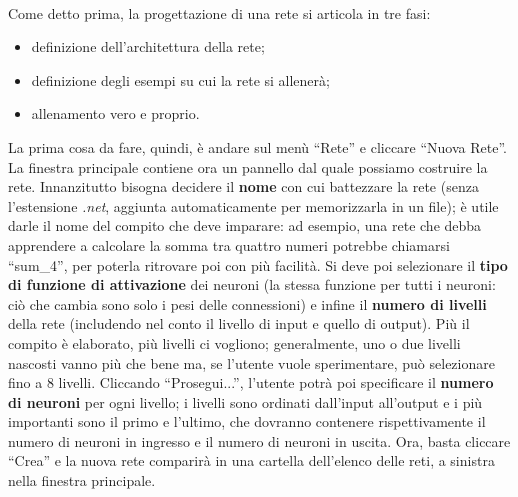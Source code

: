 \documentclass{article}
\begin{document}
\paragraph{} Come detto prima, la progettazione di una rete si articola in tre fasi:
\begin{itemize}
	\item definizione dell'architettura della rete;
	\item definizione degli esempi su cui la rete si allenerà;
	\item allenamento vero e proprio.
\end{itemize}
La prima cosa da fare, quindi, è andare sul menù “Rete” e cliccare “Nuova Rete”. La finestra principale contiene ora un pannello dal quale possiamo costruire la rete. Innanzitutto bisogna decidere il \textbf{nome} con cui battezzare la rete (senza l'estensione \textit{.net}, aggiunta automaticamente per memorizzarla in un file); è utile darle il nome del compito che deve imparare: ad esempio, una rete che debba apprendere a calcolare la somma tra quattro numeri potrebbe chiamarsi “sum\_4”, per poterla ritrovare poi con più facilità. Si deve poi selezionare il \textbf{tipo di funzione di attivazione} dei neuroni (la stessa funzione per tutti i neuroni: ciò che cambia sono solo i pesi delle connessioni) e infine il \textbf{numero di livelli} della rete (includendo nel conto il livello di input e quello di output). Più il compito è elaborato, più livelli ci vogliono; generalmente, uno o due livelli nascosti vanno più che bene ma, se l'utente vuole sperimentare, può selezionare fino a 8 livelli. Cliccando “Prosegui...”, l'utente potrà poi specificare il \textbf{numero di neuroni} per ogni livello; i livelli sono ordinati dall'input all'output e i più importanti sono il primo e l'ultimo, che dovranno contenere rispettivamente il numero di neuroni in ingresso e il numero di neuroni in uscita. Ora, basta cliccare “Crea” e la nuova rete comparirà in una cartella dell'elenco delle reti, a sinistra nella finestra principale.
\end{document}
